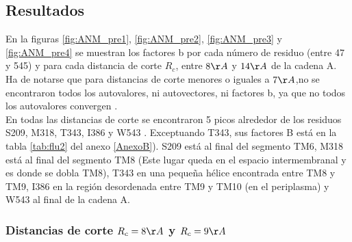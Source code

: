 \subsection{Resultados}
En la figuras \ref{fig:ANM_pre1}, \ref{fig:ANM_pre2}, \ref{fig:ANM_pre3} y \ref{fig:ANM_pre4} se muestran los factores b por cada n\'{u}mero de residuo (entre 47 y 545) y para cada distancia de corte $R_c$, entre $8\AA$ y $14\AA$ de la cadena A. Ha de notarse que para distancias de corte menores o iguales a $7\AA$,no se encontraron todos  los autovalores, ni autovectores, ni factores b, ya que no todos los autovalores convergen \cite{Zimmermann2011}.\\

En todas las distancias de corte se encontraron 5 picos alrededor de los residuos  S209, M318, T343, I386 y W543 . Exceptuando T343, sus factores B est\'{a} en la tabla \ref{tab:flu2} del anexo \ref{AnexoB}). S209 est\'{a} al final del segmento TM6, M318 est\'{a} al final del segmento TM8 (Este lugar queda en el espacio intermembranal y es donde se dobla TM8), T343 en una peque\~{n}a h\'{e}lice encontrada entre TM8 y TM9, I386 en la regi\'{o}n desordenada entre TM9 y TM10 (en el periplasma) y W543 al final de la cadena A.\\
\subsubsection{Distancias de corte $R_c=8\AA$ y $R_c=9\AA$}

